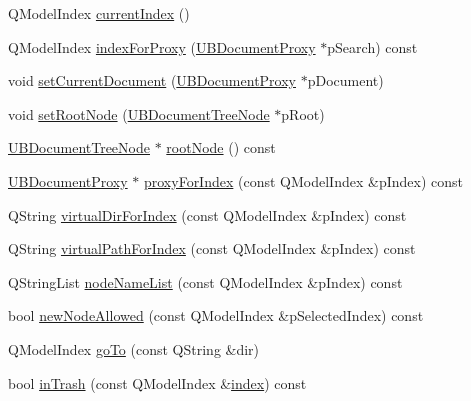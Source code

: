 \begin{DoxyCompactItemize}
\item 
Q\-Model\-Index \hyperlink{class_u_b_document_tree_model_abff2e582e5101bed6cdd3402eca1e5b0}{current\-Index} ()
\item 
Q\-Model\-Index \hyperlink{class_u_b_document_tree_model_aa36062512a401087594dddb607af8050}{index\-For\-Proxy} (\hyperlink{class_u_b_document_proxy}{U\-B\-Document\-Proxy} $\ast$p\-Search) const 
\item 
void \hyperlink{class_u_b_document_tree_model_a4ccbb4e8792484063d5af6220cf7533d}{set\-Current\-Document} (\hyperlink{class_u_b_document_proxy}{U\-B\-Document\-Proxy} $\ast$p\-Document)
\item 
void \hyperlink{class_u_b_document_tree_model_a534c789e58d81ad0ea55ff1a63604dbb}{set\-Root\-Node} (\hyperlink{class_u_b_document_tree_node}{U\-B\-Document\-Tree\-Node} $\ast$p\-Root)
\item 
\hyperlink{class_u_b_document_tree_node}{U\-B\-Document\-Tree\-Node} $\ast$ \hyperlink{class_u_b_document_tree_model_aa632fe27e083103c08ed41bcea4e1001}{root\-Node} () const 
\item 
\hyperlink{class_u_b_document_proxy}{U\-B\-Document\-Proxy} $\ast$ \hyperlink{class_u_b_document_tree_model_adc9c453bae3eb78fdf3d63db4f16f3bd}{proxy\-For\-Index} (const Q\-Model\-Index \&p\-Index) const 
\item 
Q\-String \hyperlink{class_u_b_document_tree_model_a8f1c1380c531318f25e7c39241553ddd}{virtual\-Dir\-For\-Index} (const Q\-Model\-Index \&p\-Index) const 
\item 
Q\-String \hyperlink{class_u_b_document_tree_model_a744d9613811edb1ea75823c8b0f95775}{virtual\-Path\-For\-Index} (const Q\-Model\-Index \&p\-Index) const 
\item 
Q\-String\-List \hyperlink{class_u_b_document_tree_model_ab750c5efca6d80e87c6e831a96a6fc8a}{node\-Name\-List} (const Q\-Model\-Index \&p\-Index) const 
\item 
bool \hyperlink{class_u_b_document_tree_model_a9414220451ad53871799f407f50c6ceb}{new\-Node\-Allowed} (const Q\-Model\-Index \&p\-Selected\-Index) const 
\item 
Q\-Model\-Index \hyperlink{class_u_b_document_tree_model_ae40c1b98c76d2723d0a503f3b0efd53f}{go\-To} (const Q\-String \&dir)
\item 
bool \hyperlink{class_u_b_document_tree_model_a48a94f5cf48a30ef0b684cfa57fc1eb7}{in\-Trash} (const Q\-Model\-Index \&\hyperlink{class_u_b_document_tree_model_a482d152ef1865a960d12f7d8726133b9}{index}) const 
\item 

\end{DoxyCompactItemize}

